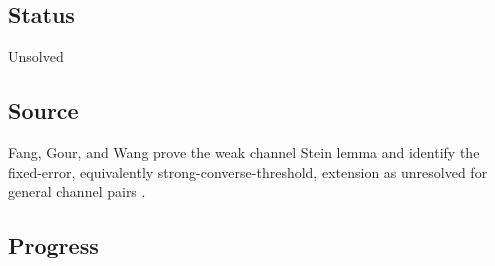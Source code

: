 \subsection*{Status}

Unsolved

\subsection*{Source}

Fang, Gour, and Wang prove the weak channel Stein lemma and identify the
fixed-error, equivalently strong-converse-threshold, extension as unresolved
for general channel pairs .

\subsection*{Progress}

